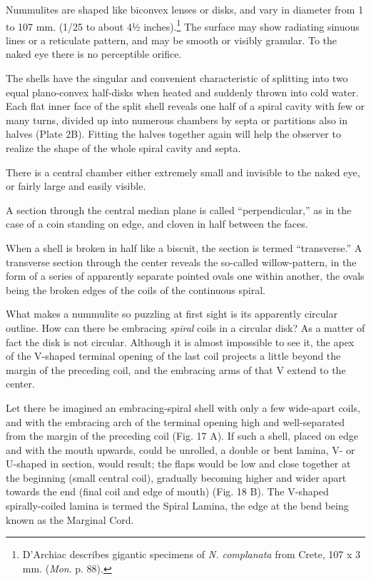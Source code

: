 \documentclass[a4paper, 12pt, oneside]{article}
\begin{document}
Nummulites are shaped like biconvex lenses or disks, and vary in diameter from 1 to 107 mm. (1/25 to about 4½ inches).\footnote{D'Archiac describes gigantic specimens of \emph{N. complanata} from Crete, 107 x 3 mm. (\emph{Mon}. p. 88).} The surface may show radiating sinuous lines or a reticulate pattern, and may be smooth or visibly granular. To the naked eye there is no perceptible orifice.

The shells have the singular and convenient characteristic of splitting into two equal plano-convex half-disks when heated and suddenly thrown into cold water. Each flat inner face of the split shell reveals one half of a spiral cavity with few or many turns, divided up into numerous chambers by septa or partitions also in halves (Plate 2B). Fitting the halves together again will help the observer to realize the shape of the whole spiral cavity and septa.

There is a central chamber either extremely small and invisible to the naked eye, or fairly large and easily visible.

A section through the central median plane is called ``perpendicular,'' as in the case of a coin standing on edge, and cloven in half between the faces.

When a shell is broken in half like a biscuit, the section is termed ``transverse.'' A transverse section through the center reveals the so-called willow-pattern, in the form of a series of apparently separate pointed ovals one within another, the ovals being the broken edges of the coils of the continuous spiral.

What makes a nummulite so puzzling at first sight is its apparently circular outline. How can there be embracing \emph{spiral} coils in a circular disk? As a matter of fact the disk is not circular. Although it is almost impossible to see it, the apex of the V-shaped terminal opening of the last coil projects a little beyond the margin of the preceding coil, and the embracing arms of that V extend to the center.

Let there be imagined an embracing-spiral shell with only a few wide-apart coils, and with the embracing arch of the terminal opening high and well-separated from the margin of the preceding coil (Fig. 17 A). If such a shell, placed on edge and with the mouth upwards, could be unrolled, a double or bent lamina, V- or U-shaped in section, would result; the flaps would be low and close together at the beginning (small central coil), gradually becoming higher and wider apart towards the end (final coil and edge of mouth) (Fig. 18 B). The V-shaped spirally-coiled lamina is termed the Spiral Lamina, the edge at the bend being known as the Marginal Cord.
\end{document}
